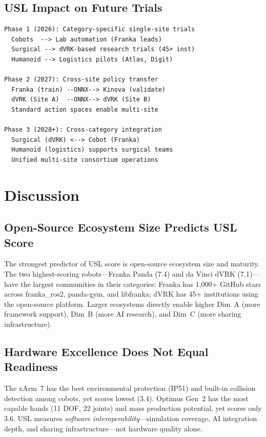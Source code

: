 \subsection{USL Impact on Future Trials}
\begin{lstlisting}[language={},basicstyle=\ttfamily\scriptsize,numbers=none,caption={Phased timeline for physical AI oncology trials}]
Phase 1 (2026): Category-specific single-site trials
  Cobots  --> Lab automation (Franka leads)
  Surgical --> dVRK-based research trials (45+ inst)
  Humanoid --> Logistics pilots (Atlas, Digit)

Phase 2 (2027): Cross-site policy transfer
  Franka (train) --ONNX--> Kinova (validate)
  dVRK (Site A)  --ONNX--> dVRK (Site B)
  Standard action spaces enable multi-site

Phase 3 (2028+): Cross-category integration
  Surgical (dVRK) <--> Cobot (Franka)
  Humanoid (logistics) supports surgical teams
  Unified multi-site consortium operations
\end{lstlisting}

\section{Discussion}
\label{sec:discussion}

\subsection{Open-Source Ecosystem Size Predicts USL Score}
The strongest predictor of USL score is open-source ecosystem size and maturity. The two highest-scoring robots---Franka Panda (7.4) and da Vinci dVRK (7.1)---have the largest communities in their categories: Franka has 1,000+ GitHub stars across franka\_ros2, panda-gym, and libfranka; dVRK has 45+ institutions using the open-source platform. Larger ecosystems directly enable higher Dim~A (more framework support), Dim~B (more AI research), and Dim~C (more sharing infrastructure).

\subsection{Hardware Excellence Does Not Equal Readiness}
The xArm~7 has the best environmental protection (IP51) and built-in collision detection among cobots, yet scores lowest (3.4). Optimus Gen~2 has the most capable hands (11 DOF, 22 joints) and mass production potential, yet scores only 3.6. USL measures \emph{software interoperability}---simulation coverage, AI integration depth, and sharing infrastructure---not hardware quality alone.

